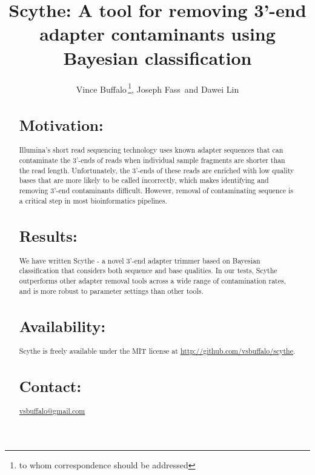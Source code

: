 \documentclass{bioinfo}
\begin{document}

\title[Scythe]{Scythe: A tool for removing 3'-end adapter contaminants using Bayesian classification}
\author[Buffalo \textit{et~al}]{Vince Buffalo\,\footnote{to whom correspondence should be addressed}, Joseph Fass\, and Dawei Lin}
\address{Bioinformatics Core, UC Davis Genome Center}



\maketitle

\begin{abstract}

\section{Motivation:}
Illumina's short read sequencing technology uses known adapter
sequences that can contaminate the 3'-ends of reads when individual
sample fragments are shorter than the read length. Unfortunately, the
3'-ends of these reads are enriched with low quality bases that are
more likely to be called incorrectly, which makes identifying and
removing 3'-end contaminants difficult. However, removal of
contaminating sequence is a critical step in most bioinformatics
pipelines.


\section{Results:} 
We have written Scythe - a novel 3'-end adapter trimmer based on
Bayesian classification that considers both sequence and base
qualities. In our tests, Scythe outperforms other adapter removal
tools across a wide range of contamination rates, and is more robust
to parameter settings than other tools.


\section{Availability:}
Scythe is freely available under the MIT license at
\href{http://github.com/vsbuffalo/scythe}{http://github.com/vsbuffalo/scythe}.


\section{Contact:} \href{mailto:vsbuffalo@gmail.com}{vsbuffalo@gmail.com}
\end{abstract}
\end{document}
